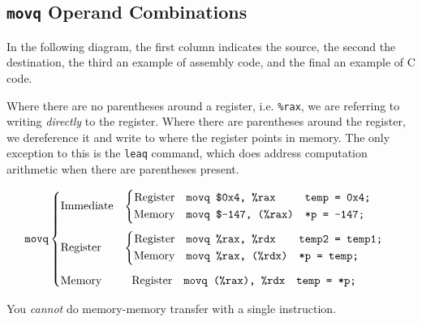 \documentclass[class=article, crop=false]{standalone}
\begin{document}
  \subsection{\texttt{movq} Operand Combinations}
  In the following diagram, the first column indicates the source, the second the destination, the third an example of assembly code, and the final an example of C code.
  \begin{note}{}
    Where there are no parentheses around a register, i.e. \texttt{\%rax}, we are referring to writing \emph{directly} to the register. Where there are parentheses around the register, we dereference it and write to where the register points in memory. The only exception to this is the \texttt{leaq} command, which does address computation arithmetic when there are parentheses present.
  \end{note}
  \[
    \texttt{movq} \begin{cases}
      \text{Immediate} & \begin{cases}\begin{aligned}
        \text{Register}&&& \texttt{movq \$0x4, \%rax} && \texttt{temp = 0x4;} \\
        \text{Memory} &&& \texttt{movq \$-147, (\%rax)} && \texttt{*p = -147;}
      \end{aligned}\end{cases} \\[15pt]
        \text{Register} & \begin{cases}\begin{aligned}
          \text{Register}&&& \texttt{movq \%rax, \%rdx} && \texttt{temp2 = temp1;} \\
          \text{Memory}&&& \texttt{movq \%rax, (\%rdx)} && \texttt{*p = temp;}
        \end{aligned}\end{cases} \\[15pt]
        \text{Memory} & \begin{aligned} 
          \hphantom{\begin{cases}\end{cases}}\text{Register} &&& \texttt{movq (\%rax), \%rdx} && \texttt{temp = *p;}
        \end{aligned}
    \end{cases}
  \]
  \begin{note}{}
    You \emph{cannot} do memory-memory transfer with a single instruction.
  \end{note}
\end{document}
